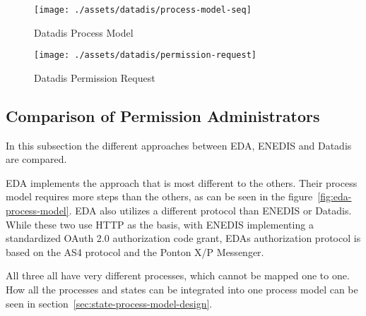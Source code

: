 \begin{figure}[h]
    \texttt{[image: ./assets/datadis/process-model-seq]}
    \caption{Datadis Process Model}
    \label{fig:datadis-process-model}
\end{figure}

\begin{figure}[h]
    \texttt{[image: ./assets/datadis/permission-request]}
    \caption{Datadis Permission Request}
    \label{fig:datadis-permission-request}
\end{figure}

\subsection{Comparison of Permission Administrators}\label{subsec:comparison-of-permission-administrators}
In this subsection the different approaches between EDA, ENEDIS and Datadis are compared.

EDA implements the approach that is most different to the others.
Their process model requires more steps than the others, as can be seen in the figure\ \ref{fig:eda-process-model}.
EDA also utilizes a different protocol than ENEDIS or Datadis.
While these two use HTTP as the basis, with ENEDIS implementing a standardized OAuth 2.0 authorization code grant, EDAs authorization protocol is based on the AS4 protocol and the Ponton X/P Messenger.

All three all have very different processes, which cannot be mapped one to one.
How all the processes and states can be integrated into one process model can be seen in section\ \ref{sec:state-process-model-design}.
